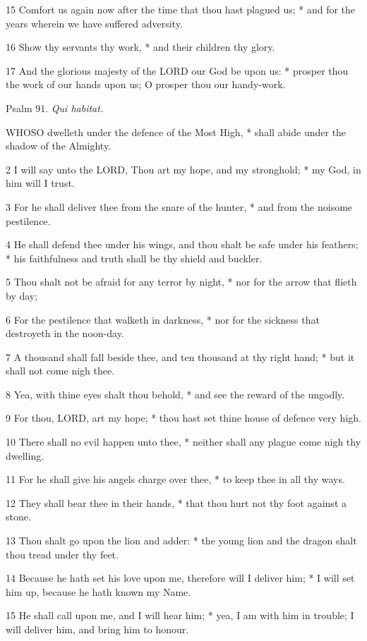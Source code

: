 15 Comfort us again now after the time that thou hast
plagued us; * and for the years wherein we have suffered adversity.

16 Show thy servants thy work, * and their children
thy glory.

17 And the glorious majesty of the LORD our God be
upon us: * prosper thou the work of our hands upon us; O prosper thou
our handy-work.

Psalm
91. \emph{Qui habitat.}

WHOSO
dwelleth under the defence of the Most High, * shall abide under the shadow
of the Almighty.

2 I will say unto the LORD, Thou art my hope, and my
stronghold; * my God, in him will I trust.

3 For he shall deliver thee from the snare of the hunter,
* and from the noisome pestilence.

4 He shall defend thee under his wings, and thou shalt
be safe under his feathers; * his faithfulness and truth shall be thy
shield and buckler.

5 Thou shalt not be afraid for any terror by night,
* nor for the arrow that flieth by day;

6 For the pestilence that walketh in darkness, * nor
for the sickness that destroyeth in the noon-day.

7 A thousand shall fall beside thee, and ten thousand
at thy right hand; * but it shall not come nigh thee.

8 Yea, with thine eyes shalt thou behold, * and see
the reward of the ungodly.

9 For thou, LORD, art my hope; * thou hast set thine
house of defence very high.

10 There shall no evil happen unto thee, * neither
shall any plague come nigh thy dwelling.

11 For he shall give his angels charge over thee, *
to keep thee in all thy ways.

12 They shall bear thee in their hands, * that thou
hurt not thy foot against a stone.

13 Thou shalt go upon the lion and adder: * the young
lion and the dragon shalt thou tread under thy feet.

14 Because he hath set his love upon me, therefore
will I deliver him; * I will set him up, because he hath known my Name.

15 He shall call upon me, and I will hear him; * yea,
I am with him in trouble; I will deliver him, and bring him to honour.

